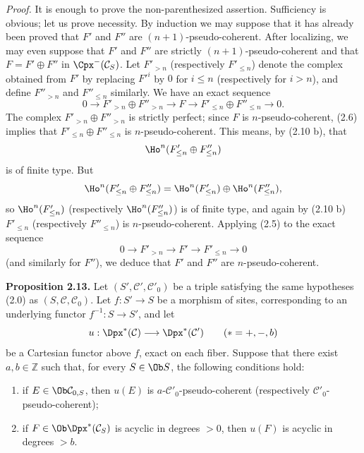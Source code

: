 \emph{Proof.} It is enough to prove the non-parenthesized assertion. Sufficiency is obvious; let us prove necessity. By induction we may suppose that it has already been proved that \(F'\) and \(F''\) are \((n+1)\)-pseudo-coherent. After localizing, we may even suppose that \(F'\) and \(F''\) are strictly \((n+1)\)-pseudo-coherent and that \(F=F'\oplus F''\) in \(\Cpx^-(\mathcal C_S)\). Let \(F'_{>n}\) (respectively \(F'_{\leq n}\)) denote the complex obtained from \(F'\) by replacing \(F'^i\) by \(0\) for \(i\leq n\) (respectively for \(i>n\)), and define \(F''_{>n}\) and \(F''_{\leq n}\) similarly. We have an exact sequence
\[
  0\longrightarrow F'_{>n}\oplus F''_{>n}\longrightarrow F
  \longrightarrow F'_{\leq n}\oplus F''_{\leq n}\longrightarrow 0 .
\]
The complex \(F'_{>n}\oplus F''_{>n}\) is strictly perfect; since \(F\) is \(n\)-pseudo-coherent, (2.6) implies that \(F'_{\leq n}\oplus F''_{\leq n}\) is \(n\)-pseudo-coherent. This means, by (2.10 b), that
\[
  \Ho^n(F'_{\leq n}\oplus F''_{\leq n})
\]
is of finite type. But
\[
  \Ho^n(F'_{\leq n}\oplus F''_{\leq n})
  =\Ho^n(F'_{\leq n})\oplus \Ho^n(F''_{\leq n}),
\]
so \(\Ho^n(F'_{\leq n})\) (respectively \(\Ho^n(F''_{\leq n})\)) is of finite type, and again by (2.10 b) \(F'_{\leq n}\) (respectively \(F''_{\leq n}\)) is \(n\)-pseudo-coherent. Applying (2.5) to the exact sequence
\[
  0\longrightarrow F'_{>n}\longrightarrow F'\longrightarrow F'_{\leq n}\longrightarrow 0
\]
(and similarly for \(F''\)), we deduce that \(F'\) and \(F''\) are \(n\)-pseudo-coherent.

\textbf{Proposition 2.13.} Let \((S',\mathcal C',\mathcal C'_0)\) be a triple satisfying the same hypotheses (2.0) as \((S,\mathcal C,\mathcal C_0)\). Let \(f:S'\to S\) be a morphism of sites, corresponding to an underlying functor \(f^{-1}:S\to S'\), and let
\[
  u:\Dpx^*(\mathcal C)\longrightarrow \Dpx^*(\mathcal C')\qquad (*=+,-,b)
\]
be a Cartesian functor above \(f\), exact on each fiber. Suppose that there exist \(a,b\in\mathbb Z\) such that, for every \(S\in\Ob S\), the following conditions hold:

\begin{enumerate}[label=(\roman*)]
\item if \(E\in\Ob\mathcal C_{0,S}\), then \(u(E)\) is \(a\)-\(\mathcal C'_0\)-pseudo-coherent (respectively \(\mathcal C'_0\)-pseudo-coherent);
\item if \(F\in\Ob\Dpx^*(\mathcal C_S)\) is acyclic in degrees \(>0\), then \(u(F)\) is acyclic in degrees \(>b\).
\end{enumerate}


